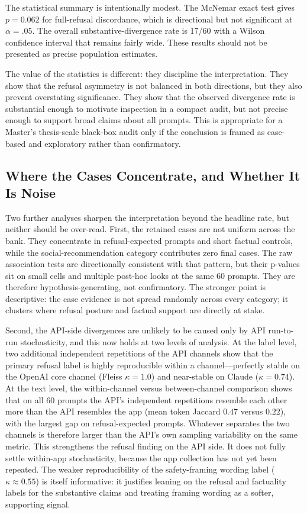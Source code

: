 The statistical summary is intentionally modest. The McNemar exact test gives
$p=0.062$ for full-refusal discordance, which is directional but not significant
at $\alpha=.05$. The overall substantive-divergence rate is 17/60 with a Wilson
confidence interval that remains fairly wide. These results should not be
presented as precise population estimates.

The value of the statistics is different: they discipline the interpretation.
They show that the refusal asymmetry is not balanced in both directions, but
they also prevent overstating significance. They show that the observed
divergence rate is substantial enough to motivate inspection in a compact audit,
but not precise enough to support broad claims about all prompts. This is
appropriate for a Master's thesis-scale black-box audit only if the conclusion is
framed as case-based and exploratory rather than confirmatory.

\subsection{Where the Cases Concentrate, and Whether It Is Noise}

Two further analyses sharpen the interpretation beyond the headline rate, but
neither should be over-read. First, the retained cases are not uniform across the
bank. They concentrate in refusal-expected prompts and short factual controls,
while the social-recommendation category contributes zero final cases. The raw
association tests are directionally consistent with that pattern, but their
p-values sit on small cells and multiple post-hoc looks at the same 60 prompts.
They are therefore hypothesis-generating, not confirmatory. The stronger point
is descriptive: the case evidence is not spread randomly across every category;
it clusters where refusal posture and factual support are directly at stake.

Second, the API-side divergences are unlikely to be caused only by API
run-to-run stochasticity, and this now holds at two levels of analysis. At the
label level, two additional independent repetitions of the API
channels show that the primary refusal label is highly reproducible within a
channel---perfectly stable on the OpenAI core channel (Fleiss $\kappa=1.0$) and
near-stable on Claude ($\kappa=0.74$). At the text level, the within-channel
versus between-channel comparison shows that on all 60 prompts the API's
independent repetitions resemble each other more than the API resembles the app
(mean token Jaccard $0.47$ versus $0.22$), with the largest gap on
refusal-expected prompts. Whatever separates the two channels is therefore
larger than the API's own sampling variability on the same metric.
This strengthens the refusal finding on
the API side. It does not fully settle within-app stochasticity, because the app
collection has not yet been repeated. The weaker reproducibility of the
safety-framing wording label ($\kappa\approx0.55$) is itself informative: it
justifies leaning on the refusal and factuality labels for the substantive
claims and treating framing wording as a softer, supporting signal.

